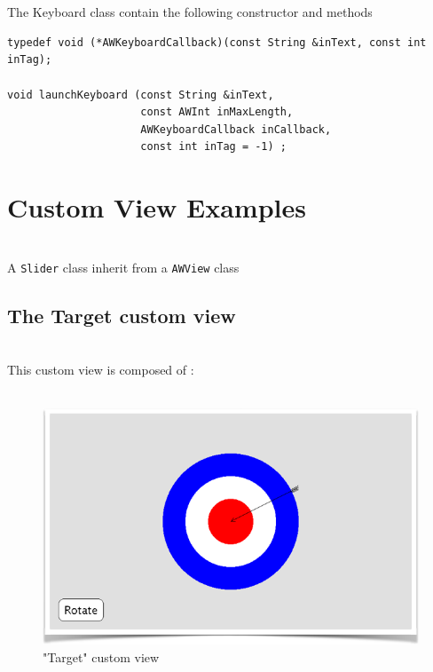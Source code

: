 \documentclass[a4paper,11pt]{extarticle}
\begin{document}
~\\

~\\ The Keyboard class contain the following constructor and methods

\begin{lstlisting}[language=Arduinonl]
typedef void (*AWKeyboardCallback)(const String &inText, const int inTag);

void launchKeyboard (const String &inText,
                     const AWInt inMaxLength,
                     AWKeyboardCallback inCallback,
                     const int inTag = -1) ;
\end{lstlisting}


\newpage
\section{Custom View Examples}

~\\ A \texttt{Slider} class inherit from a \texttt{AWView} class
~\\

\newpage
\subsection{The Target custom view}

~\\ This custom view is composed of :
~\\
~\\

\begin{figure}[htbp]
   \centering
   \includegraphics[scale=0.7]{AWFig19.png} 
   \caption{"Target" custom view}
   \label{fig:19 }
\end{figure}
\end{document}
